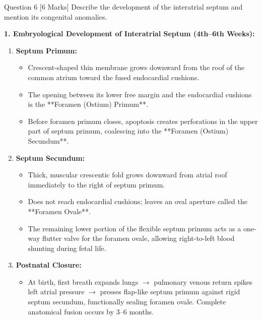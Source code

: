 \documentclass[11pt,a4paper]{article}
\begin{document}
\begin{qbox}{Question 6 [6 Marks]}
Describe the development of the interatrial septum and mention its congenital anomalies.
\end{qbox}

\begin{ansbox}
\textbf{1. Embryological Development of Interatrial Septum (4th--6th Weeks):}
\begin{enumerate}[leftmargin=*]
    \item \textbf{Septum Primum:}
    \begin{itemize}
        \item Crescent-shaped thin membrane grows downward from the roof of the common atrium toward the fused endocardial cushions.
        \item The opening between its lower free margin and the endocardial cushions is the **Foramen (Ostium) Primum**.
        \item Before foramen primum closes, apoptosis creates perforations in the upper part of septum primum, coalescing into the **Foramen (Ostium) Secundum**.
    \end{itemize}
    \item \textbf{Septum Secundum:}
    \begin{itemize}
        \item Thick, muscular crescentic fold grows downward from atrial roof immediately to the right of septum primum.
        \item Does not reach endocardial cushions; leaves an oval aperture called the **Foramen Ovale**.
        \item The remaining lower portion of the flexible septum primum acts as a one-way flutter valve for the foramen ovale, allowing right-to-left blood shunting during fetal life.
    \end{itemize}
    \item \textbf{Postnatal Closure:}
    \begin{itemize}
        \item At birth, first breath expands lungs $\rightarrow$ pulmonary venous return spikes left atrial pressure $\rightarrow$ presses flap-like septum primum against rigid septum secundum, functionally sealing foramen ovale. Complete anatomical fusion occurs by 3--6 months.
    \end{itemize}
\end{enumerate}


\end{ansbox}
\end{document}
